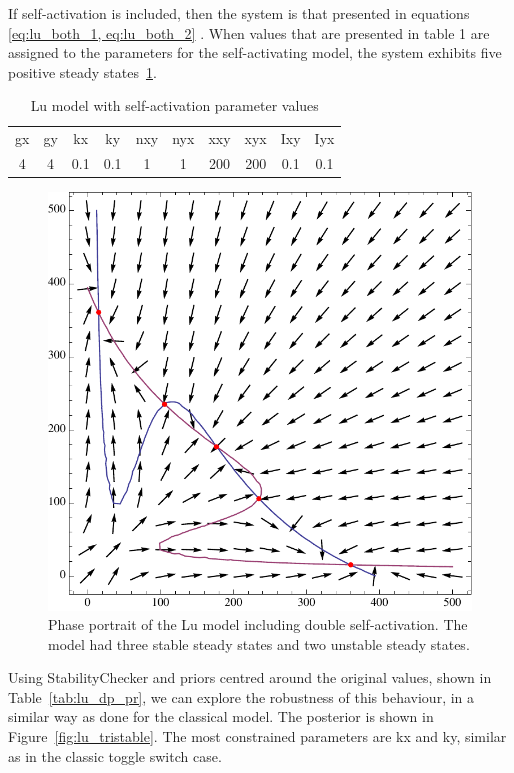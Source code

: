 If self-activation is included, then the system is that presented in equations \eqref{eq:lu_both_1, eq:lu_both_2} . When values that are presented in table 1 are assigned to the parameters for the self-activating model, the system exhibits five positive steady states~\ref{fig:lu_tri_phse}. 

\clearpage
\begin{table}[p]
\centering
\caption{Lu model with self-activation parameter values}
\label{tab:lu_dp_tri}
\begin{tabular}{cccccccccc}
gx    & gy    & kx    & ky    & nxy & nyx & xxy     & xyx     & Ixy   & Iyx \\
4&4     &0.1   & 0.1   &  1  &  1  &  200    &  200    & 0.1    &   0.1
\end{tabular}
\end{table}

\begin{figure}[p]
\centering
\includegraphics[scale=0.7]{images/Lu/mae/selfactivation.pdf}
\caption{Phase portrait of the Lu model including double self-activation. The model had three stable steady states and two unstable steady states.}
\label{fig:lu_tri_phse}
\end{figure}

Using StabilityChecker and priors centred around the original values, shown in Table~\ref{tab:lu_dp_pr}, we can explore the robustness of this behaviour, in a similar way as done for the classical model. The posterior is shown in Figure~\ref{fig:lu_tristable}. The most constrained parameters are kx and ky, similar as in the classic toggle switch case.

